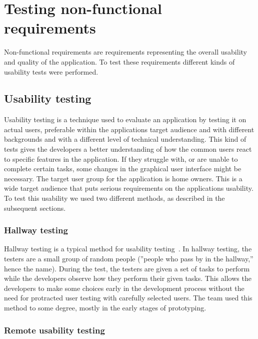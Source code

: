 \section{Testing non-functional requirements}
\label{sec:testingnonfunctionalrequirements}
Non-functional requirements are requirements representing the overall usability and quality of the application. To test these requirements different kinds of usability tests were performed.

\subsection{Usability testing}
\label{sec:userTest}
Usability testing is a technique used to evaluate an application by testing it on actual users, preferable within the applications target audience and with different backgrounds and with a different level of technical understanding. This kind of tests gives the developers a better understanding of how the common users react to specific features in the application. If they struggle with, or are unable to complete certain tasks, some changes in the graphical user interface might be necessary.
The target user group for the application is home owners. This is a wide target audience that puts serious requirements on the applications usability. To test this usability we used two different methods, as described in the subsequent sections.

\subsubsection{Hallway testing}
Hallway testing is a typical method for usability testing~\cite{hallwaytesting}. In hallway testing, the testers are a small group of random people (''people who pass by in the hallway,'' hence the name). During the test, the testers are given a set of tasks to perform while the developers observe how they perform their given tasks. This allows the developers to make some choices early in the development process without the need for protracted user testing with carefully selected users. 
The team used this method to some degree, mostly in the early stages of prototyping.

\subsubsection{Remote usability testing}

